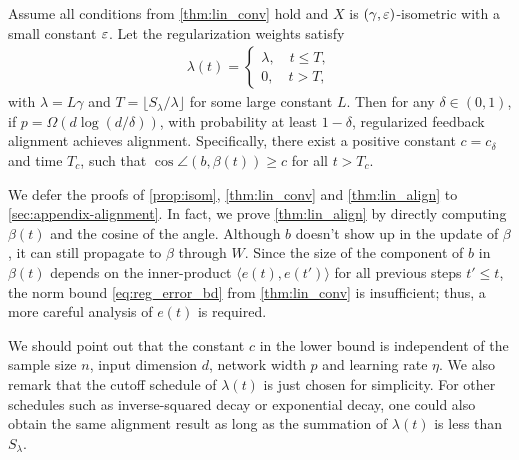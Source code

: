 \begin{theorem}
\label{thm:lin_align}
Assume all conditions from \cref{thm:lin_conv} hold and $X$ is $(\gamma, \varepsilon)$-isometric with a small constant $\varepsilon$. Let the regularization weights satisfy
\begin{align*}
\lambda(t) =
\begin{cases}
    \lambda, \quad t\leq T,\\
    0, \quad t > T,
\end{cases}
\end{align*}
with $\lambda=L\gamma$ and $T = \lfloor S_\lambda/\lambda\rfloor$ for some large constant $L$. Then for any $\delta\in(0,1)$, if $p = \Omega(d\log(d/\delta))$, with probability at least $1-\delta$, regularized feedback alignment  achieves alignment. Specifically, there exist a positive constant $c=c_\delta$ and time $T_c$, such that $\cos\angle(b, \beta(t))\geq c$ for all $t>T_c$.
\end{theorem}

We defer the proofs of \cref{prop:isom}, \cref{thm:lin_conv} and \cref{thm:lin_align} to \cref{sec:appendix-alignment}. In fact, we prove \cref{thm:lin_align} by directly computing $\beta(t)$ and the cosine of the angle. Although $b$ doesn't show up in the update of $\beta$, it can still propagate to $\beta$ through $W$. Since the size of the component of $b$ in $\beta(t)$ depends on the inner-product $\langle e(t), e(t')\rangle$ for all previous steps $t'\leq t$, the norm bound \eqref{eq:reg_error_bd} from \cref{thm:lin_conv} is insufficient; thus, a more careful analysis of $e(t)$ is required.

We should point out that the constant $c$ in the lower bound is independent of the sample size $n$, input dimension $d$, network width $p$ and learning rate $\eta$. We also remark that the cutoff schedule of $\lambda(t)$ is just chosen for simplicity. For other schedules such as inverse-squared decay or exponential decay, one could also obtain the same alignment result as long as the summation of $\lambda(t)$ is less than $S_\lambda$.

